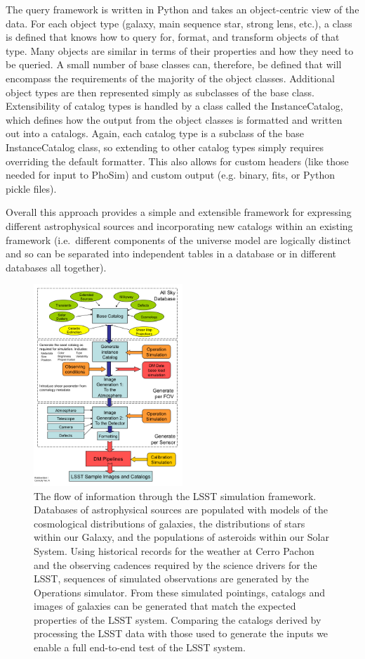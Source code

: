 \documentclass[11pt]{article}
\begin{document}
The query framework is written in Python and takes an object-centric
view of the data.  For each object type (galaxy, main sequence star,
strong lens, etc.), a class is defined that knows how to query for,
format, and transform objects of that type.  Many objects are similar
in terms of their properties and how they need to be queried.  A small
number of base classes can, therefore, be defined that will encompass
the requirements of the majority of the object classes.  Additional
object types are then represented simply as subclasses of the base
class. Extensibility of catalog types is handled by a class called the
InstanceCatalog, which defines how the output from the object classes
is formatted and written out into a catalogs.  Again, each catalog
type is a subclass of the base InstanceCatalog class, so extending to
other catalog types simply requires overriding the default formatter.
This also allows for custom headers (like those needed for input to
PhoSim) and custom output (e.g. binary, fits, or Python pickle files).

Overall this approach provides a simple and extensible framework for
expressing different astrophysical sources and incorporating new
catalogs within an existing framework (i.e.\ different components of
the universe model are logically distinct and so can be separated into
independent tables in a database or in different databases all
together).

\begin{figure}[h]
\centerline{\includegraphics[width=0.5\textwidth]{validation_figures/flow.png}}
\caption{The flow of information through the LSST simulation
 framework. Databases of astrophysical sources are populated with
 models of the cosmological distributions of galaxies, the
 distributions of stars within our Galaxy, and the populations of
 asteroids within our Solar System. Using historical records for the
 weather at Cerro Pachon and the observing cadences required by the
 science drivers for the LSST, sequences of simulated observations
 are generated by the Operations simulator. From these simulated
 pointings, catalogs and images of galaxies can be generated that
 match the expected properties of the LSST system. Comparing the
 catalogs derived by processing the LSST data with those used to
 generate the inputs we enable a full end-to-end test of the LSST
 system.}
\label{fig:flow}       %
\end{figure}
\end{document}
